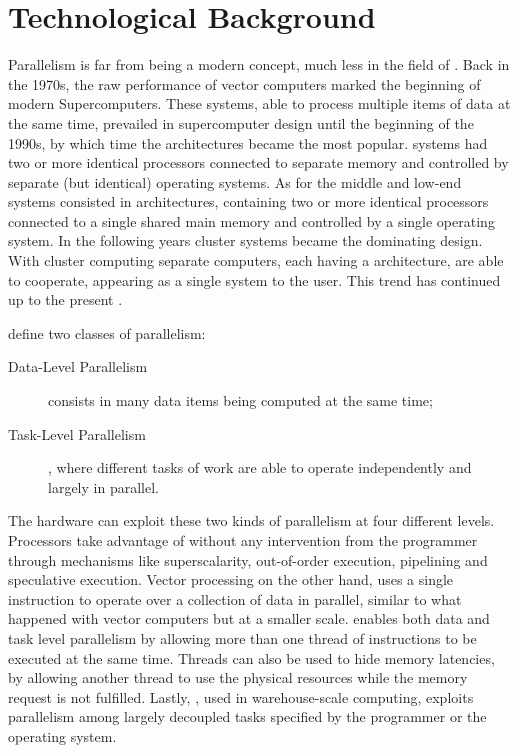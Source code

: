 \documentclass[../thesis]{subfiles}
\begin{document}
	\chapter{Technological Background}
	\label{chp:techbg}


	Parallelism is far from being a modern concept, much less in the field of \hpc. Back in the 1970s, the raw performance of vector computers marked the beginning of modern Supercomputers\cite{Strohmaier:2005:20years}. These systems, able to process multiple items of data at the same time, prevailed in supercomputer design until the beginning of the 1990s, by which time the \mpp architectures became the most popular. \mpp systems had two or more identical processors connected to separate memory and controlled by separate (but identical) operating systems. As for the middle and low-end systems consisted in \smp architectures, containing two or more identical processors connected to a single shared main memory and controlled by a single operating system. In the following years cluster systems became the dominating design. With cluster computing separate computers, each having a \smp architecture, are able to cooperate, appearing as a single system to the user. This trend has continued up to the present \cite{TheNextWave:1:2013:Supercomputers,TOP500:overtime}.

	 define two classes of parallelism:
		\begin{description}
			\item [Data-Level Parallelism] consists in many data items being computed at the same time;
			\item [Task-Level Parallelism], where different tasks of work are able to operate independently and largely in parallel.
		\end{description}
	 The hardware can exploit these two kinds of parallelism at four different levels. Processors take advantage of \ilp without any intervention from the programmer through mechanisms like superscalarity, out-of-order execution, pipelining and speculative execution. Vector processing on the other hand, uses a single instruction to operate over a collection of data in parallel, similar to what happened with vector computers but at a smaller scale. \tlp enables both data and task level parallelism by allowing more than one thread of instructions to be executed at the same time. Threads can also be used to hide memory latencies, by allowing another thread to use the physical resources while the memory request is not fulfilled. Lastly, \rlp, used in warehouse-scale computing, exploits parallelism among largely decoupled tasks specified by the programmer or the operating system.
\end{document}
